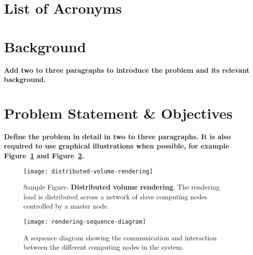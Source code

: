 \documentclass[12pt]{article} 				%
\begin{document}
\newpage
\section*{List of Acronyms} 
\begin{acronym}
\end{acronym}

\clearpage

\normalfont 

\section{Background} \label{section:background}
\textbf{Add two to three paragraphs to introduce the problem and its relevant background.}

\section{Problem Statement \& Objectives} \label{section:problem-statement}
\textbf{Define the problem in detail in two to three paragraphs. It is also required to use graphical illustrations when possible, for example Figure~\ref{figure:distributed-volume-rendering} and Figure~\ref{figure:rendering-sequence-diagram}. }

\begin{figure}[h!]
\centering 
\texttt{[image: distributed-volume-rendering]}
\caption{Sample Figure. \textbf{Distributed volume rendering}. The rendering load is distributed across a network of slave computing nodes controlled by a master node.}
\label{figure:distributed-volume-rendering}
\end{figure}

\begin{figure}[h!]
\centering 
\texttt{[image: rendering-sequence-diagram]}
\caption{A sequence diagram showing the communication and interaction between the different computing nodes in the system.}
\label{figure:rendering-sequence-diagram}
\end{figure}
\end{document}
